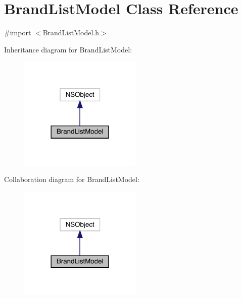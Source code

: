 \hypertarget{interface_brand_list_model}{}\section{Brand\+List\+Model Class Reference}
\label{interface_brand_list_model}


{\ttfamily \#import $<$Brand\+List\+Model.\+h$>$}



Inheritance diagram for Brand\+List\+Model\+:\nopagebreak
\begin{figure}[H]
\begin{center}
\leavevmode
\includegraphics[width=165pt]{interface_brand_list_model__inherit__graph}
\end{center}
\end{figure}


Collaboration diagram for Brand\+List\+Model\+:\nopagebreak
\begin{figure}[H]
\begin{center}
\leavevmode
\includegraphics[width=165pt]{interface_brand_list_model__coll__graph}
\end{center}
\end{figure}

